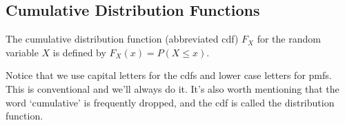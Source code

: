 \subsection*{Cumulative Distribution Functions}\label{DiscreteExpectationSec}

\begin{defn}
The cumulative distribution function (abbreviated cdf) $F_X$ for the random variable $X$ is defined by $F_X(x) = P(X \leq x)$.
\end{defn}

Notice that we use capital letters for the cdfs and lower case letters for pmfs. This is conventional and we'll always do it. It's also worth mentioning that the word `cumulative' is frequently dropped, and the cdf is called the distribution function.

